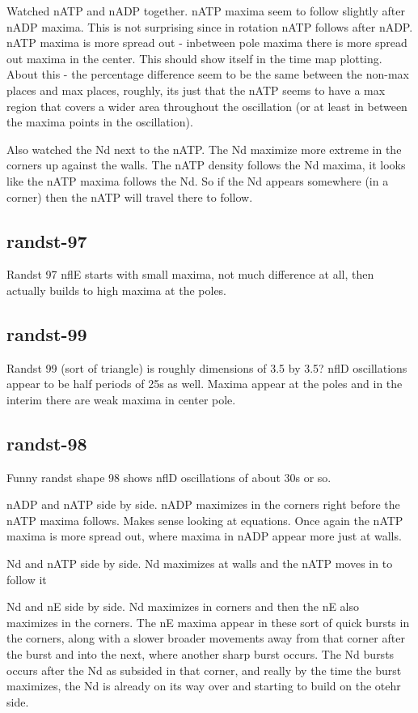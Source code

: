 \documentclass[letterpaper,twocolumn,amsmath,amssymb,pre]{revtex4-1}
\begin{document}
Watched nATP and nADP together.  nATP maxima seem to follow slightly
after nADP maxima.  This is not surprising since in rotation nATP
follows after nADP.  nATP maxima is more spread out - inbetween pole
maxima there is more spread out maxima in the center.  This should
show itself in the time map plotting.  About this - the percentage
difference seem to be the same between the non-max places and max
places, roughly, its just that the nATP seems to have a max region
that covers a wider area throughout the oscillation (or at least in
between the maxima points in the oscillation).

Also watched the Nd next to the nATP.  The Nd maximize more extreme in
the corners up against the walls.  The nATP density follows the Nd
maxima, it looks like the nATP maxima follows the Nd.  So if the Nd
appears somewhere (in a corner) then the nATP will travel there to
follow.


\subsection{randst-97}
Randst 97 nflE starts with small maxima, not much difference at all,
then actually builds to high maxima at the poles.
\subsection{randst-99}
Randst 99 (sort of triangle) is roughly dimensions of 3.5 by 3.5?
nflD oscillations appear to be half periods of 25s as well.  Maxima appear
at the poles and in the interim there are weak maxima in center pole.
\subsection{randst-98}
Funny randst shape 98 shows nflD oscillations of about 30s or so.

nADP and nATP side by side.  nADP maximizes in the corners right
before the nATP maxima follows.  Makes sense looking at equations.
Once again the nATP maxima is more spread out, where maxima in nADP
appear more just at walls.

Nd and nATP side by side.  Nd maximizes at walls and the nATP moves in
to follow it

Nd and nE side by side.  Nd maximizes in corners and then the nE also
maximizes in the corners.  The nE maxima appear in these sort of quick
bursts in the corners, along with a slower broader movements away from
that corner after the burst and into the next, where another sharp
burst occurs.  The Nd bursts occurs after the Nd as subsided in that
corner, and really by the time the burst maximizes, the Nd is already
on its way over and starting to build on the otehr side.
\end{document}
